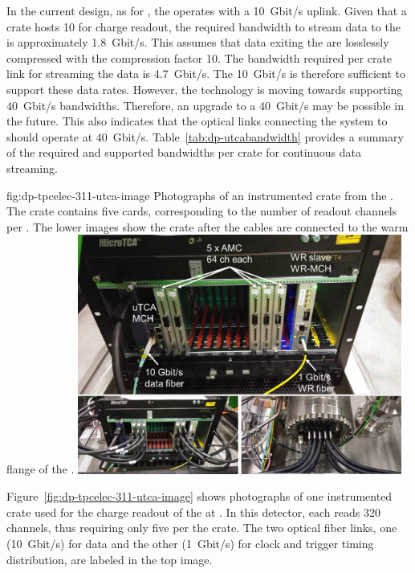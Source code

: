 In the current  design, as for , the  operates with a \SI{10}{Gbit/s} uplink. Given that a  crate hosts \num{10}  for charge readout, the required bandwidth to stream data to the  is approximately \SI{1.8}{Gbit/s}. This assumes that data exiting the  are losslessly compressed with the compression factor \num{10}. The bandwidth required per crate link for streaming the  data is \SI{4.7}{Gbit/s}. The \SI{10}{Gbit/s}  is therefore sufficient to support these data rates. However, the technology is moving towards  supporting \SI{40}{Gbit/s} bandwidths. Therefore, an upgrade to a \SI{40}{Gbit/s}  may be possible in the future. This also indicates that the optical links connecting the  system to   should operate at \SI{40}{Gbit/s}. Table~\ref{tab:dp-utcabandwidth} provides a summary of the required and supported bandwidths per  crate for continuous data streaming.


\begin{dunefigure}
{fig:dp-tpcelec-311-utca-image}
{Photographs of an instrumented  crate from the . The crate contains five  cards, corresponding to the number of readout channels per  . The lower images show the crate after the  cables are connected to the warm flange of the .}
\includegraphics[width=0.8\textwidth]{graphics/dp-tpcelec-311-utca-image}
\end{dunefigure}

Figure~\ref{fig:dp-tpcelec-311-utca-image} shows photographs of one instrumented  crate used for the charge readout of the  at . In this detector, each  reads \num{320} channels, thus requiring only five  per the  crate. The two optical fiber links, one (\SI{10}{Gbit/s}) for data and the other (\SI{1}{Gbit/s}) for clock and trigger timing distribution, are labeled in the top image. 

